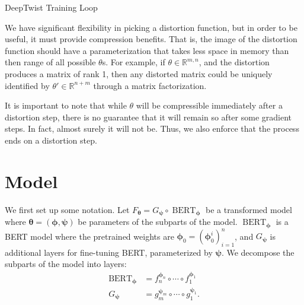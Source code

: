 \documentclass[10pt]{article}
\newcommand{\bert}{\operatorname{BERT}}
\newcommand{\distortion}{\operatorname{Distortion}}
\newcommand{\btheta}{{\bm{\theta}}}
\newcommand{\bphi}{{\bm{\phi}}}
\newcommand{\bpsi}{{\bm{\psi}}}
\begin{document}
\begin{algorithm}
  \begin{algorithmic}
        \STATE{$\theta \leftarrow \distortion(\theta)$}
      \ENDIF
    \ENDFOR
    \STATE{$\theta \leftarrow \distortion(\theta)$}
  \end{algorithmic}
  \caption{DeepTwist Training Loop}
  \label{algo:deeptwist}
\end{algorithm}

We have significant flexibility in picking a distortion function, but in order
to be useful, it must provide compression benefits. That is, the image of the
distortion function should have a parameterization that takes less space in
memory than then range of all possible $\theta$s. For example, if $\theta \in
\mathbb{R}^{m,n}$, and the distortion produces a matrix of rank 1, then any
distorted matrix could be uniquely identified by $\theta' \in \mathbb{R}^{n+m}$
through a matrix factorization.

It is important to note that while $\theta$ will be compressible immediately
after a distortion step, there is no guarantee that it will remain so after some
gradient steps. In fact, almost surely it will not be. Thus, we also enforce
that the process ends on a distortion step.

\section{Model}
\label{sec:model}

We first set up some notation. Let $F_\btheta = G_\bpsi \circ \bert_\bphi$ be
a transformed model where $\btheta = (\bphi, \bpsi)$ be parameters of the
subparts of the model. $\bert_\bphi$ is a BERT model where the pretrained
weights are $\bphi_0 = (\bphi_0^i)_{i=1}^n$, and $G_\bpsi$ is additional
layers for fine-tuning BERT, parameterized by $\bpsi$. We decompose the
subparts of the model into layers: \begin{align*}
\bert_\bphi &= f_{n}^{\bphi_n} \circ \cdots \circ f_1^{\bphi_1} \\
G_\bpsi &= g_{m}^{\bpsi_m} \circ \cdots \circ g_1^{\bpsi_1}.
\end{align*}
\end{document}
